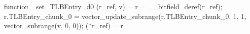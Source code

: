 function _set_TLBEntry_d0 (r_ref, v) = {
    r = __bitfield_deref(r_ref);
    r.TLBEntry_chunk_0 = vector_update_subrange(r.TLBEntry_chunk_0, 1, 1, vector_subrange(v, 0, 0));
    (*r_ref) = r
}
